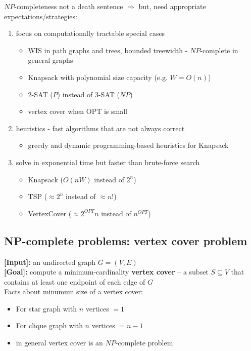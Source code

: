 \documentclass[a4paper,12pt]{article}
\theoremstyle{plain}
\theoremstyle{definition}
\theoremstyle{remark}
\begin{document}
$NP$-completeness not a death sentence $\Rightarrow$ but, need appropriate expectations/strategies:
\begin{enumerate}
	\item focus on computationally tractable special cases
	\begin{itemize}
		\item WIS in path graphs and trees, bounded treewidth - $NP$-complete in general graphs
		\item Knapsack with polynomial size capacity (e.g. $W = O(n)$)
		\item 2-SAT ($P$) instead of 3-SAT ($NP$)
		\item vertex cover when OPT is small
	\end{itemize}
	\item heuristics - fast algorithms that are not always correct
	\begin{itemize}
		\item greedy and dynamic programming-based heuristics for Knapsack
	\end{itemize}
	\item solve in exponential time but faster than brute-force search
	\begin{itemize}
		\item Knapsack ($O(nW)$ instead of $2^n$)
		\item TSP ($\approx 2^n$ instead of $\approx n!$)
		\item VertexCover ($\approx 2^{OPT}n$ instead of $n^{OPT}$)
	\end{itemize}
\end{enumerate}



\subsection{NP-complete problems: vertex cover problem}
\textbf{[Input]:} an undirected graph $G=(V, E)$
\\

\textbf{[Goal]:} compute a minimum-cardinality \textbf{vertex cover} -- a subset $S \subseteq V$ that contains at least one endpoint of each edge of $G$
\\

Facts about minumum size of a vertex cover:
\begin{itemize}
	\item For star graph with $n$ vertices $= 1$
	\item For clique graph with $n$ vertices $= n-1$
	\item in general vertex cover is an $NP$-complete problem
\end{itemize}
\end{document}
